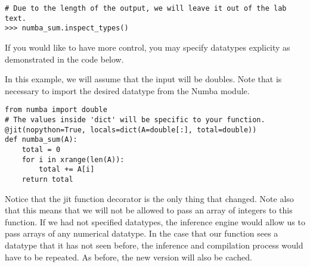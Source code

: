 \begin{lstlisting}
# Due to the length of the output, we will leave it out of the lab text.
>>> numba_sum.inspect_types()
\end{lstlisting}

If you would like to have more control, you may specify datatypes explicity as demonstrated in the code below.

In this example, we will assume that the input will be doubles. Note that is necessary to import the desired datatype from the Numba module.

\begin{lstlisting}
from numba import double
# The values inside 'dict' will be specific to your function.
@jit(nopython=True, locals=dict(A=double[:], total=double))
def numba_sum(A):
    total = 0
    for i in xrange(len(A)):
        total += A[i]
    return total
\end{lstlisting}
Notice that the jit function decorator is the only thing that changed. Note also that this means that we will not be allowed to pass an array of integers to this function. If we had not specified datatypes, the inference engine would allow us to pass arrays of any numerical datatype. In the case that our function sees a datatype that it has not seen before, the inference and compilation process would have to be repeated. As before, the new version will also be cached.

